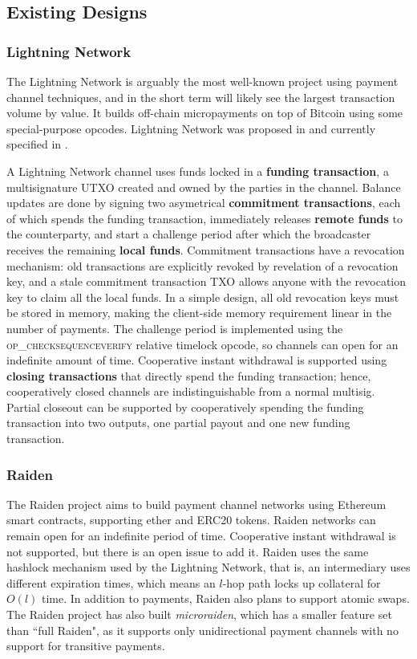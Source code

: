 \documentclass[prb,floatfix,reprint,nofootinbib,amsmath,amssymb,epsfig,pre,floats,letterpaper,groupedaffiliation,tightenlines,allcolors=blue,11pt]{revtex4}
\theoremstyle{definition}
\theoremstyle{definition}
\theoremstyle{definition}
\begin{document}
\subsection{Existing Designs}

\subsubsection{Lightning Network}

The Lightning Network is arguably the most well-known project using payment channel techniques, and in the short term will likely see the largest transaction volume by value. It builds off-chain micropayments on top of Bitcoin using some special-purpose opcodes. Lightning Network was proposed in \cite{Poon_2016} and currently specified in \cite{Lightning_RFC}.

A Lightning Network channel uses funds locked in a \textbf{funding transaction}, a multisignature UTXO created and owned by the parties in the channel. Balance updates are done by signing two asymetrical \textbf{commitment transactions}, each of which spends the funding transaction, immediately releases \textbf{remote funds} to the counterparty, and start a challenge period after which the broadcaster receives the remaining \textbf{local funds}. Commitment transactions have a revocation mechanism: old transactions are explicitly revoked by revelation of a revocation key, and a stale commitment transaction TXO allows anyone with the revocation key to claim all the local funds. In a simple design, all old revocation keys must be stored in memory, making the client-side memory requirement linear in the number of payments. The challenge period is implemented using the \textsc{op\_checksequenceverify} relative timelock opcode, so channels can open for an indefinite amount of time. Cooperative instant withdrawal is supported using \textbf{closing transactions} that directly spend the funding transaction; hence, cooperatively closed channels are indistinguishable from a normal multisig. Partial closeout can be supported by cooperatively spending the funding transaction into two outputs, one partial payout and one new funding transaction.

\subsubsection{Raiden}

The Raiden project \cite{readthedocs:raidenspec} aims to build payment channel networks using Ethereum smart contracts, supporting ether and ERC20 tokens. Raiden networks can remain open for an indefinite period of time. Cooperative instant withdrawal is not supported, but there is an open issue to add it. Raiden uses the same hashlock mechanism used by the Lightning Network, that is, an intermediary uses different expiration times, which means an $l$-hop path locks up collateral for $O(l)$ time. In addition to payments, Raiden also plans to support atomic swaps. The Raiden project has also built \textit{microraiden}, which has a smaller feature set than ``full Raiden", as it supports only unidirectional payment channels with no support for transitive payments.
\end{document}
